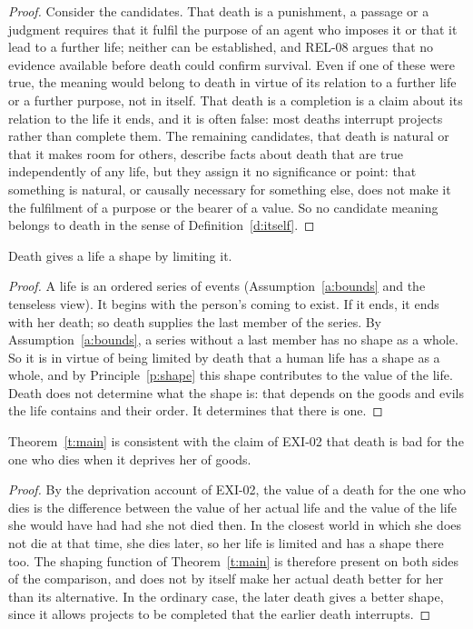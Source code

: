 \documentclass{situationist-preprint}
\begin{document}
\begin{proof}
Consider the candidates. That death is a punishment, a passage or a judgment requires that it fulfil the purpose of an agent who imposes it or that it lead to a further life; neither can be established, and REL-08 argues that no evidence available before death could confirm survival. Even if one of these were true, the meaning would belong to death in virtue of its relation to a further life or a further purpose, not in itself. That death is a completion is a claim about its relation to the life it ends, and it is often false: most deaths interrupt projects rather than complete them. The remaining candidates, that death is natural or that it makes room for others, describe facts about death that are true independently of any life, but they assign it no significance or point: that something is natural, or causally necessary for something else, does not make it the fulfilment of a purpose or the bearer of a value. So no candidate meaning belongs to death in the sense of Definition~\ref{d:itself}.
\end{proof}

\begin{theorem}\label{t:main}
Death gives a life a shape by limiting it.
\end{theorem}

\begin{proof}
A life is an ordered series of events (Assumption~\ref{a:bounds} and the tenseless view). It begins with the person's coming to exist. If it ends, it ends with her death; so death supplies the last member of the series. By Assumption~\ref{a:bounds}, a series without a last member has no shape as a whole. So it is in virtue of being limited by death that a human life has a shape as a whole, and by Principle~\ref{p:shape} this shape contributes to the value of the life. Death does not determine what the shape is: that depends on the goods and evils the life contains and their order. It determines that there is one.
\end{proof}

\begin{corollary}\label{c:comp}
Theorem~\ref{t:main} is consistent with the claim of EXI-02 that death is bad for the one who dies when it deprives her of goods.
\end{corollary}

\begin{proof}
By the deprivation account of EXI-02, the value of a death for the one who dies is the difference between the value of her actual life and the value of the life she would have had had she not died then. In the closest world in which she does not die at that time, she dies later, so her life is limited and has a shape there too. The shaping function of Theorem~\ref{t:main} is therefore present on both sides of the comparison, and does not by itself make her actual death better for her than its alternative. In the ordinary case, the later death gives a better shape, since it allows projects to be completed that the earlier death interrupts.
\end{proof}
\end{document}
